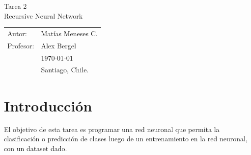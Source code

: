 \documentclass[11pt,letterpaper]{article}
\begin{document}
\newpage
\pagestyle{fancy}
\fancyhf{}
\vspace*{6cm}
\begin{center}
\Huge  {Tarea 2}\\
\vspace{1cm}
\huge {Recursive Neural Network}\\
\end{center}
\vfill
\begin{flushright}
\begin{tabular}{ll}
Autor: & Matías Meneses C.\\
Profesor: & Alex Bergel\\
& \today\\
& Santiago, Chile.
\end{tabular}
\end{flushright}

\newpage
\pagestyle{fancy}
\fancyhf{}

\fancyhead[R]{\small \rm \textbf{\thepage}} %



\renewcommand{\sectionmark}[1]{\markright{\thesection.\ #1}}
\renewcommand{\headrulewidth}{0.5pt}
\renewcommand{\footrulewidth}{0.5pt}


\tableofcontents

\newpage
\section{Introducción}
El objetivo de esta tarea es programar una red neuronal que permita
la clasificación o predicción de clases luego de un entrenamiento en la red
neuronal, con un dataset dado.\\
\end{document}
